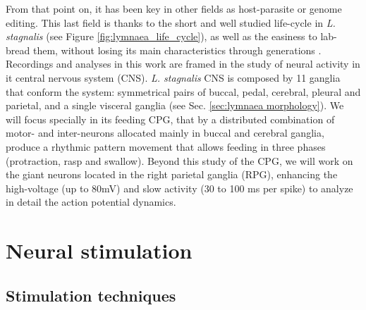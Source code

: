 From that point on, it has been key in other fields as host-parasite or genome editing. This last field is thanks to the short and well studied life-cycle in \textit{L. stagnalis} (see Figure \ref{fig:lymnaea_life_cycle}), as well as the easiness to lab-bread them, without losing its main characteristics through generations \parencite{noland_observations_1946}. Recordings and analyses in this work are framed in the study of neural activity in it central nervous system (CNS). \textit{L. stagnalis} CNS is composed by 11 ganglia that conform the system: symmetrical pairs of buccal, pedal, cerebral, pleural and parietal, and a single visceral ganglia (see Sec. \ref{sec:lymnaea morphology}). We will focus specially in its feeding CPG, that by a distributed combination of motor- and inter-neurons allocated mainly in buccal and cerebral ganglia, produce a rhythmic pattern movement that allows feeding in three phases (protraction, rasp and swallow). Beyond this study of the CPG, we will work on the giant neurons located in the right parietal ganglia (RPG), enhancing the high-voltage (up to 80mV) and slow activity (30 to 100 ms per spike) to analyze in detail the action potential dynamics. 


\section{Neural stimulation}
\subsection{Stimulation techniques}

